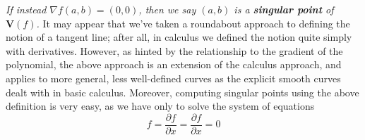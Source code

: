 \documentclass{article}
\begin{document}
\newline
\indent \textit{If instead $ \nabla f(a, b) = (0, 0) $, then we say $ (a, b) $ is a \textbf{singular point} of $ \mathbf{V}(f)$.}
\newline \newline
It may appear that we've taken a roundabout approach to defining the notion of a tangent line; after all, in calculus we defined the notion quite simply with derivatives. However, as hinted by the relationship to the gradient of the polynomial, the above approach is an extension of the calculus approach, and applies to more general, less well-defined curves as the explicit smooth curves dealt with in basic calculus. Moreover, computing singular points using the above definition is very easy, as we have only to solve the system of equations
$$ f = \frac{\partial f}{\partial x} = \frac{\partial f}{\partial x} = 0 $$
\end{document}
